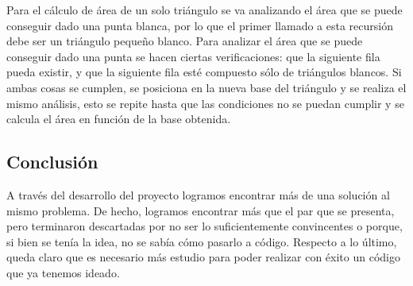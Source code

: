 \documentclass[letterpaper]{article}
\begin{document}
  Para el c\'alculo de \'area de un solo tri\'angulo se va analizando el \'area que se puede conseguir dado una punta blanca,
  por lo que el primer llamado a esta recursi\'on debe ser un tri\'angulo pequeño blanco. Para analizar el \'area
  que se puede conseguir dado una punta se hacen ciertas verificaciones: que la siguiente fila pueda existir, y que
  la siguiente fila est\'e compuesto s\'olo de tri\'angulos blancos. Si ambas cosas se cumplen, se posiciona en la nueva
  base del tri\'angulo y se realiza el mismo an\'alisis, esto se repite hasta que las condiciones no se puedan
  cumplir y se calcula el \'area en funci\'on de la base obtenida.

  \subsection{Conclusi\'on}



  A trav\'es del desarrollo del proyecto logramos encontrar m\'as de una soluci\'on al mismo
  problema. De hecho, logramos encontrar m\'as que el par que se presenta, pero terminaron
  descartadas por no ser lo suficientemente convincentes o porque, si bien se ten\'ia
  la idea, no se sab\'ia c\'omo pasarlo a c\'odigo. Respecto a lo \'ultimo, queda claro
  que es necesario m\'as estudio para poder realizar con \'exito un c\'odigo que ya tenemos ideado.
\end{document}
